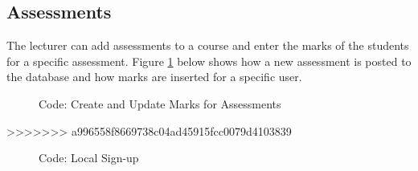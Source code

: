 \documentclass[a4paper,12pt]{article}
\numberwithin{equation}{section} %
\numberwithin{figure}{section}
\begin{document}
\subsection{Assessments}
The lecturer can add assessments to a course and enter the marks of the students for a specific assessment. Figure \ref{cAses} below shows how a new assessment is posted to the database and how marks are inserted for a specific user.

\begin{figure}[H]
\centering
{}
\caption{Code: Create and Update Marks for Assessments}
\label{cAses}
\end{figure}


>>>>>>> a996558f8669738c04ad45915fcc0079d4103839

\begin{figure}[H]
\centering
{}
\caption{Code: Local Sign-up}
\label{cLocalSignup}
\end{figure}
\end{document}
